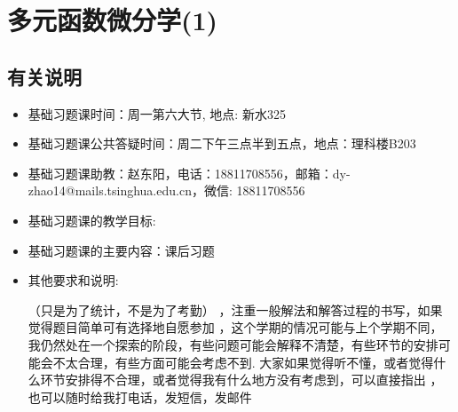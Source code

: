 \documentclass[12pt,UTF8]{ctexart}
\begin{document}
\setcounter{section}{13}
\section{多元函数微分学(1)}
\noindent
\subsection{有关说明}
\begin{itemize}
\item 基础习题课时间：周一第六大节, 地点: 新水325
\item 基础习题课公共答疑时间：周二下午三点半到五点，地点：理科楼B203
\item 基础习题课助教：赵东阳，电话：18811708556，邮箱：dy-zhao14@mails.tsinghua.edu.cn，微信: 18811708556
\item 基础习题课的教学目标:
	\begin{itemize}
	\end{itemize}
\item 基础习题课的主要内容：课后习题
\item 其他要求和说明:
	\begin{itemize}
		（只是为了统计，不是为了考勤）
		，注重一般解法和解答过程的书写，如果觉得题目简单可有选择地自愿参加
		，这个学期的情况可能与上个学期不同，我仍然处在一个探索的阶段，有些问题可能会解释不清楚，有些环节的安排可能会不太合理，有些方面可能会考虑不到. 大家如果觉得听不懂，或者觉得什么环节安排得不合理，或者觉得我有什么地方没有考虑到，可以直接指出						，也可以随时给我打电话，发短信，发邮件
	\end{itemize}
\end{itemize}
\end{document}
